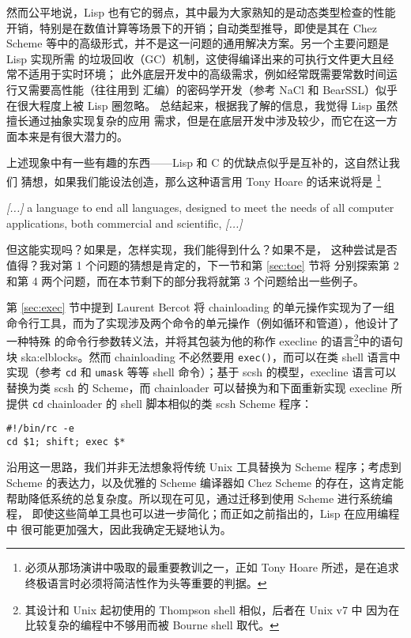 然而公平地说，Lisp 也有它的弱点，其中最为大家熟知的是动态类型检查的性能
开销，特别是在数值计算等场景下的开销；自动类型推导，即使是其在 Chez Scheme
等中的高级形式，并不是这一问题的通用解决方案。另一个主要问题是 Lisp 实现所需
的垃圾回收（GC）机制，这使得编译出来的可执行文件更大且经常不适用于实时环境；
此外底层开发中的高级需求，例如经常既需要常数时间运行又需要高性能（往往用到
汇编）的密码学开发（参考 NaCl 和 BearSSL）似乎在很大程度上被 Lisp 圈忽略。
总结起来，根据我了解的信息，我觉得 Lisp 虽然擅长通过抽象实现复杂的应用
需求，但是在底层开发中涉及较少，而它在这一方面本来是有很大潜力的。

上述现象中有一些有趣的东西——Lisp 和 C 的优缺点似乎是互补的，这自然让我们
猜想，如果我们能设法创造，那么这种语言用 Tony Hoare 的话来说将是%
\footnote{必须从那场演讲中吸取的最重要教训之一，正如 Tony Hoare
所述，是在追求终极语言时必须将简洁性作为头等重要的判据。}
\begin{quoting}
	\emph{[...]} a language to end all languages, designed to meet the needs
	of all computer applications, both commercial and scientific, \emph{[...]}
\end{quoting}
但这能实现吗？如果是，怎样实现，我们能得到什么？如果不是，
这种尝试是否值得？我对第 1 个问题的猜想是肯定的，下一节和第 \ref{sec:toe} 节将
分别探索第 2 和第 4 两个问题，而在本节剩下的部分我将就第 3 个问题给出一些例子。

第 \ref{sec:exec} 节中提到 Laurent Bercot 将 chainloading 的单元操作实现为了一组
命令行工具，而为了实现涉及两个命令的单元操作（例如循环和管道），他设计了一种特殊
的命令行参数转义法，并将其包装为他的称作 execline 的语言\footnote{其设计和 Unix
起初使用的 Thompson shell 相似，后者在 Unix v7 中
因为在比较复杂的编程中不够用而被 Bourne shell 取代。}中的语句块\cupercite%
{ska:elblocks}。然而 chainloading 不必然要用 \verb|exec()|，而可以在类 shell
语言中实现（参考 \verb|cd| 和 \verb|umask| 等等 shell
命令）；基于 scsh 的模型，execline 语言可以替换为类 scsh
的 Scheme，而 chainloader 可以替换为和下面重新实现 execline 所提供 \verb|cd|
chainloader 的 shell 脚本相似的类 scsh Scheme 程序：
\begin{quoting}
\begin{Verbatim}
#!/bin/rc -e
cd $1; shift; exec $*
\end{Verbatim}
\end{quoting}

沿用这一思路，我们并非无法想象将传统 Unix 工具替换为 Scheme 程序；考虑到
Scheme 的表达力，以及优雅的 Scheme 编译器如 Chez Scheme 的存在，这肯定能
帮助降低系统的总复杂度。所以现在可见，通过迁移到使用 Scheme 进行系统编程，
即使这些简单工具也可以进一步简化；而正如之前指出的，Lisp 在应用编程中
很可能更加强大，因此我确定无疑地认为。

